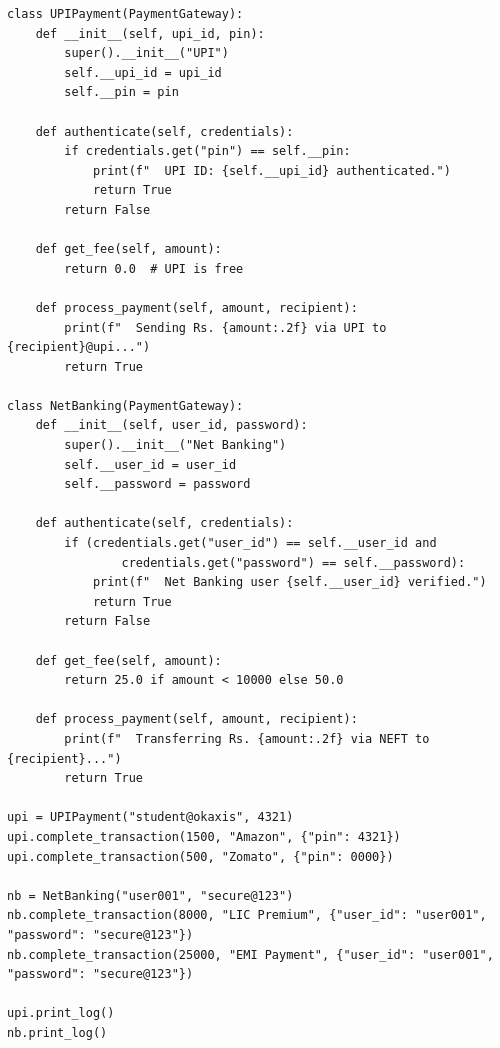 \documentclass[12pt,a4paper]{article}
\begin{document}
\begin{lstlisting}
class UPIPayment(PaymentGateway):
    def __init__(self, upi_id, pin):
        super().__init__("UPI")
        self.__upi_id = upi_id
        self.__pin = pin

    def authenticate(self, credentials):
        if credentials.get("pin") == self.__pin:
            print(f"  UPI ID: {self.__upi_id} authenticated.")
            return True
        return False

    def get_fee(self, amount):
        return 0.0  # UPI is free

    def process_payment(self, amount, recipient):
        print(f"  Sending Rs. {amount:.2f} via UPI to {recipient}@upi...")
        return True

class NetBanking(PaymentGateway):
    def __init__(self, user_id, password):
        super().__init__("Net Banking")
        self.__user_id = user_id
        self.__password = password

    def authenticate(self, credentials):
        if (credentials.get("user_id") == self.__user_id and
                credentials.get("password") == self.__password):
            print(f"  Net Banking user {self.__user_id} verified.")
            return True
        return False

    def get_fee(self, amount):
        return 25.0 if amount < 10000 else 50.0

    def process_payment(self, amount, recipient):
        print(f"  Transferring Rs. {amount:.2f} via NEFT to {recipient}...")
        return True

upi = UPIPayment("student@okaxis", 4321)
upi.complete_transaction(1500, "Amazon", {"pin": 4321})
upi.complete_transaction(500, "Zomato", {"pin": 0000})

nb = NetBanking("user001", "secure@123")
nb.complete_transaction(8000, "LIC Premium", {"user_id": "user001", "password": "secure@123"})
nb.complete_transaction(25000, "EMI Payment", {"user_id": "user001", "password": "secure@123"})

upi.print_log()
nb.print_log()
\end{lstlisting}
\end{document}
